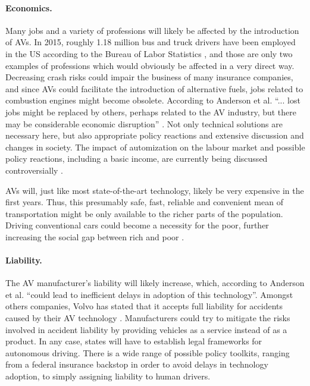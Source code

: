 \documentclass[11pt]{article}
\begin{document}
\paragraph{Economics.}
Many jobs and a variety of professions will likely be affected by the introduction of AVs. In 2015, roughly 1.18 million bus and truck drivers have been employed in the US according to the Bureau of Labor Statistics \cite{USLabourBureau2016}, and those are only two examples of professions which would obviously be affected in a very direct way. Decreasing crash risks could impair the business of many insurance companies, and since AVs could facilitate the introduction of alternative fuels, jobs related to combustion engines might become obsolete. According to Anderson et al. ``... lost jobs might be replaced by others, perhaps related to the AV industry, but there may be considerable economic disruption'' \cite[p. 40ff]{Anderson2014rand}. Not only technical solutions are necessary here, but also appropriate policy reactions and extensive discussion and changes in society. The impact of automization on the labour market and possible policy reactions, including a basic income, are currently being discussed controversially \cite{VanDerVeen2002, Olsen2014}.

AVs will, just like most state-of-the-art technology, likely be very expensive in the first years. Thus, this presumably safe, fast, reliable and convenient mean of transportation might be only available to the richer parts of the population. Driving conventional cars could become a necessity for the poor, further increasing the social gap between rich and poor \cite[p. 39]{Anderson2014rand}.

\paragraph{Liability.}
The AV manufacturer's liability will likely increase, which, according to Anderson et al. ``could lead to inefficient delays in adoption of this technology''. Amongst others companies, Volvo has stated that it accepts full liability for accidents caused by their AV technology \cite{HarrisVolvo2015}. Manufacturers could try to mitigate the risks involved in accident liability by providing vehicles as a service instead of as a product. In any case, states will have to establish legal frameworks for autonomous driving. There is a wide range of possible policy toolkits, ranging from a federal insurance backstop in order to avoid delays in technology adoption, to simply assigning liability to human drivers.
\end{document}
